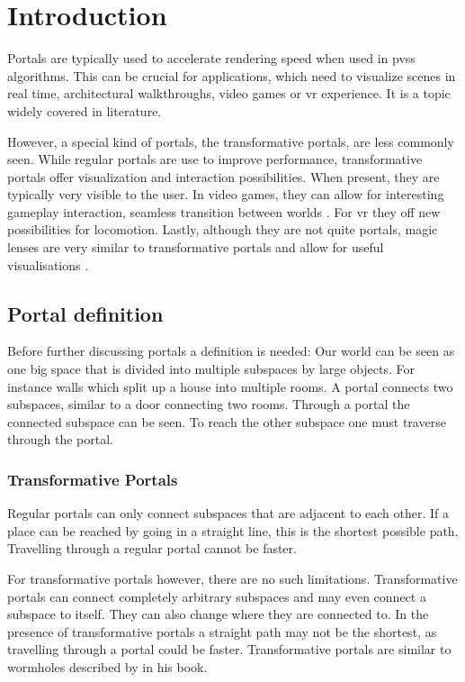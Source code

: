 
\chapter{Introduction}

Portals are typically used to accelerate rendering speed when used in \glspl{pvs} \cite{luebke:1995:portals} algorithms. This can be crucial for applications, which need to visualize scenes in real time, architectural walkthroughs, video games or \gls{vr} experience. It is a topic widely covered in literature.

However, a special kind of portals, the transformative portals, are less commonly seen. While regular portals are use to improve performance, transformative portals offer visualization and interaction possibilities. When present, they are typically very visible to the user. In video games, they can allow for interesting gameplay interaction, seamless transition between worlds \cite{schmalstieg:1999:sewing}. For \gls{vr} they off new possibilities for locomotion. Lastly, although they are not quite portals, magic lenses are very similar to transformative portals and allow for useful visualisations \cite{viega:1996:3d}.

\section{Portal definition}
Before further discussing portals a definition is needed: Our world can be seen as one big space that is divided into multiple subspaces by large objects. For instance walls which split up a house into multiple rooms. A portal connects two subspaces, similar to a door connecting two rooms. Through a portal the connected subspace can be seen. To reach the other subspace one must traverse through the portal.

\subsection{Transformative Portals}
Regular portals can only connect subspaces that are adjacent to each other. If a place can be reached by going in a straight line, this is the shortest possible path. Travelling through a regular portal cannot be faster.

For transformative portals however, there are no such limitations. Transformative portals can connect completely arbitrary subspaces and may even connect a subspace to itself. They can also change where they are connected to. In the presence of transformative portals a straight path may not be the shortest, as travelling through a portal could be faster. Transformative portals are similar to wormholes described by \textcite{Visser:Wormholes} in his book.

